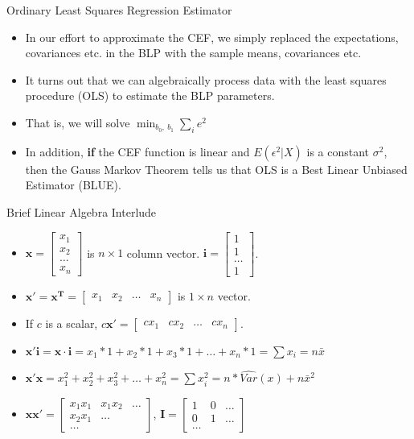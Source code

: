 \documentclass[aspectratio=169, handout]{beamer}
\numberwithin{equation}{section}
\begin{document}
\begin{frame}{Ordinary Least Squares Regression Estimator}
\begin{itemize}
\item In our effort to approximate the CEF, we simply replaced the expectations, covariances etc. in the BLP with the sample means, covariances etc.\pause
\item It turns out that we can algebraically process data with the least squares procedure (OLS) to estimate the BLP parameters.\pause
\item That is, we will solve $\min_{b_0,\ b_1} \sum_i e^2$\pause
\item In addition, \textbf{if} the CEF function is linear and $E(\epsilon^2|X)$ is a constant $\sigma^2$, then the Gauss Markov Theorem tells us that OLS is a Best Linear Unbiased Estimator (BLUE).
\end{itemize}
\end{frame}


\begin{frame}{Brief Linear Algebra Interlude}
\begin{itemize}
\item $\bm{x}=\begin{bmatrix} x_1 \\ x_2 \\ \ldots \\ x_n \end{bmatrix}$ is $n \times 1$ column vector.  $\bm{i}=\begin{bmatrix}   1\\ 1\\ \ldots\\ 1\end{bmatrix}$.  \pause
\item $\bm{x'}=\bm{x^{T}}=\begin{bmatrix} x_1 & x_2 & \ldots & x_n \end{bmatrix}$ is $1 \times n$ vector.\pause
\item If $c$ is a scalar, $c\bm{x'}=\begin{bmatrix} cx_1 & cx_2 & \ldots & cx_n \end{bmatrix}$.
\item $\bm{x'i}=\bm{x\cdot i}= x_1*1+x_2*1+x_3*1+ \ldots+ x_n*1=\sum x_i=n\bar{x}$\pause
\item $\bm{x'x}= x_1^2+x_2^2+x_3^2+ \ldots+ x_n^2=\sum x_i^2=n*\widehat{Var}(x)+n\bar{x}^2$\pause
\item $\bm{xx'}=\begin{bmatrix} x_1x_1& x_1x_2&\ldots\\  x_2x_1&\ldots\\ \ldots \end{bmatrix}$, \quad $\bm{I}=\begin{bmatrix} 1& 0&\ldots\\ 0&1&\ldots\\ \ldots  \end{bmatrix}$
\end{itemize}
\end{frame}
\end{document}
